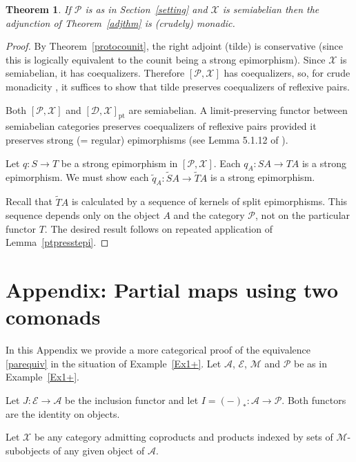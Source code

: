 \documentclass[a4paper,12pt,reqno]{amsart}
\newtheorem{theorem}{Theorem}[section] %
\theoremstyle{definition}
\theoremstyle{fact}
\theoremstyle{genquest}
\theoremstyle{step}
\newcommand{\lra}{\longrightarrow}
\newcommand{\ra}{\rightarrow}
\def\CA{{\mathscr A}}
\def\CD{{\mathscr D}}
\def\CE{{\mathscr E}}
\def\CM{{\mathscr M}}
\def\CP{{\mathscr P}}
\def\CX{{\mathscr X}}
\begin{document}
\begin{theorem}
If $\CP$ is as in Section~\ref{setting} and $\CX$ is semiabelian then the adjunction
of Theorem~\ref{adjthm} is (crudely) monadic.
\end{theorem}
 \begin{proof}
 By Theorem~\ref{protocounit}, the right adjoint (tilde) is conservative (since this is 
 logically equivalent to the counit being a strong epimorphism).
 Since $\CX$ is semiabelian, it has coequalizers. 
 Therefore $[\CP,\CX]$ has coequalizers, so, for crude monadicity \cite{CWM}, 
 it suffices to show that tilde preserves coequalizers of reflexive pairs.
 
 Both $[\CP,\CX]$ and $[\CD,\CX]_{\mathrm{pt}}$ are semiabelian.
 A limit-preserving functor between semiabelian categories preserves coequalizers of
 reflexive pairs provided it preserves strong (= regular) epimorphisms 
 (see Lemma 5.1.12 of \cite{BorBou04}).
 
 Let $q:S\ra T$ be a strong epimorphism in $[\CP,\CX]$.
 Each $q_A:SA\ra TA$ is a strong epimorphism.
 We must show each $\widetilde{q}_A:\widetilde{S}A\ra \widetilde{T}A$ is a strong epimorphism.
 
 Recall that $\widetilde{T}A$ is calculated by a sequence of kernels of split epimorphisms.
 This sequence depends only on the object $A$ and the category $\CP$, not on the
 particular functor $T$. 
 The desired result follows on repeated application of Lemma~\ref{ptpresstepi}.   
  \end{proof}
  
\section{Appendix: Partial maps using two comonads }\label{append}

In this Appendix we provide a more categorical proof of the equivalence 
\eqref{parequiv} in the situation of Example~\ref{Ex1+}. 
Let $\CA$, $\CE$, $\CM$ and $\CP$ be as in Example~\ref{Ex1+}.
  
Let $J:\CE \lra \CA$ be the inclusion functor and let $I = (-)_* :\CA \lra \CP$.
Both functors are the identity on objects.

Let $\CX$ be any category admitting coproducts and products indexed by
sets of $\CM$-subobjects of any given object of $\CA$.
\end{document}
